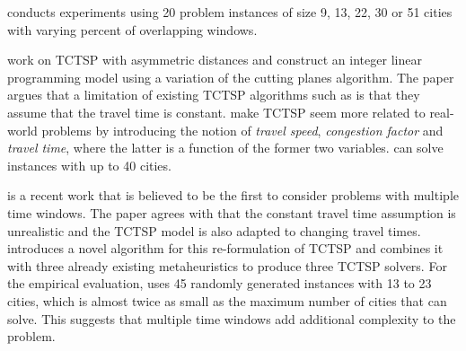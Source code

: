 \documentclass{mprop}
\theoremstyle{definition}
\begin{document}


\citet{Baker83} conducts experiments using 20 problem instances of size 9, 13, 22, 30 or 51 cities with varying percent of overlapping windows.

\citet{ariglianotime} work on TCTSP with asymmetric distances 
and construct an integer linear programming model using a variation of the cutting planes algorithm. The paper argues that a limitation of existing TCTSP algorithms such as \citep{Baker83} is that they assume that the travel time is constant. \citet{ariglianotime} make TCTSP seem more related to real-world problems by introducing the notion of \textit{travel speed}, \textit{congestion factor} and \textit{travel time}, where the latter is a function of the former two variables. \citet{ariglianotime} can solve instances with up to 40 cities.

\citet{Hurkala15} is a recent work that is believed to be the first to consider problems with multiple time windows. The paper agrees with \citet{ariglianotime} that the constant travel time assumption is unrealistic and the TCTSP model is also adapted to changing travel times. \citet{Hurkala15} introduces a novel algorithm for this re-formulation of TCTSP and combines it with three already existing metaheuristics to produce three TCTSP solvers. For the empirical evaluation, \citet{Hurkala15} uses 45 randomly generated instances with 13 to 23 cities, which is almost twice as small as the maximum number of cities that \citet{ariglianotime} can solve. This suggests that multiple time windows add additional complexity to the problem.
\end{document}
